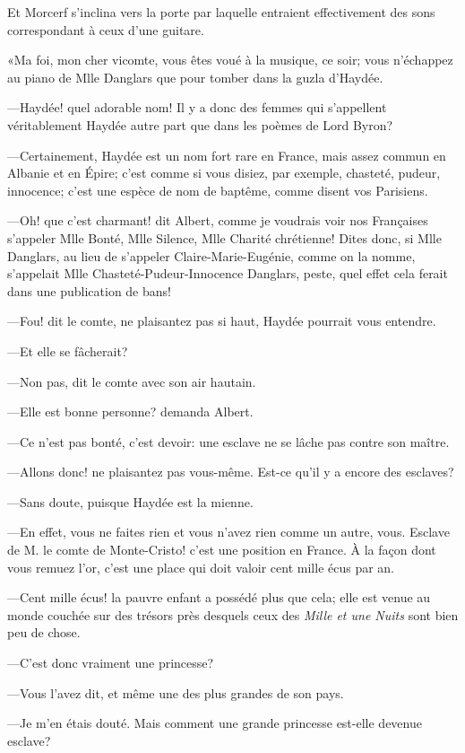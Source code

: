 Et Morcerf s'inclina vers la porte par laquelle entraient effectivement des sons correspondant à ceux d'une guitare. 

«Ma foi, mon cher vicomte, vous êtes voué à la musique, ce soir; vous n'échappez au piano de Mlle Danglars que pour tomber dans la guzla d'Haydée. 

—Haydée! quel adorable nom! Il y a donc des femmes qui s'appellent véritablement Haydée autre part que dans les poèmes de Lord Byron? 

—Certainement, Haydée est un nom fort rare en France, mais assez commun en Albanie et en Épire; c'est comme si vous disiez, par exemple, chasteté, pudeur, innocence; c'est une espèce de nom de baptême, comme disent vos Parisiens. 

—Oh! que c'est charmant! dit Albert, comme je voudrais voir nos Françaises s'appeler Mlle Bonté, Mlle Silence, Mlle Charité chrétienne! Dites donc, si Mlle Danglars, au lieu de s'appeler Claire-Marie-Eugénie, comme on la nomme, s'appelait Mlle Chasteté-Pudeur-Innocence Danglars, peste, quel effet cela ferait dans une publication de bans! 

—Fou! dit le comte, ne plaisantez pas si haut, Haydée pourrait vous entendre. 

—Et elle se fâcherait? 

—Non pas, dit le comte avec son air hautain. 

—Elle est bonne personne? demanda Albert. 

—Ce n'est pas bonté, c'est devoir: une esclave ne se lâche pas contre son maître. 

—Allons donc! ne plaisantez pas vous-même. Est-ce qu'il y a encore des esclaves? 

—Sans doute, puisque Haydée est la mienne. 

—En effet, vous ne faites rien et vous n'avez rien comme un autre, vous. Esclave de M. le comte de Monte-Cristo! c'est une position en France. À la façon dont vous remuez l'or, c'est une place qui doit valoir cent mille écus par an. 

—Cent mille écus! la pauvre enfant a possédé plus que cela; elle est venue au monde couchée sur des trésors près desquels ceux des \textit{Mille et une Nuits} sont bien peu de chose. 

—C'est donc vraiment une princesse? 

—Vous l'avez dit, et même une des plus grandes de son pays. 

—Je m'en étais douté. Mais comment une grande princesse est-elle devenue esclave? 

